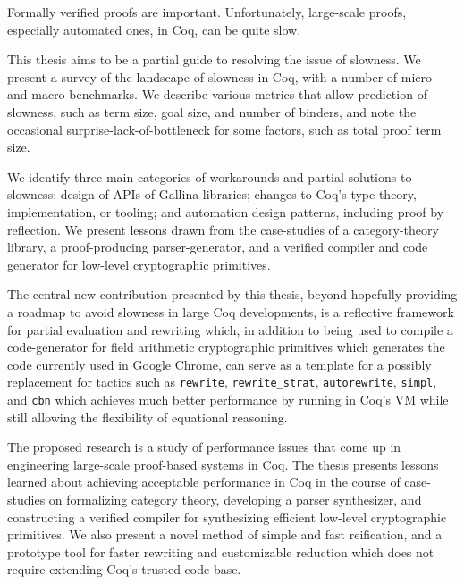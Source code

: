 %
%
%
Formally verified proofs are important.
Unfortunately, large-scale proofs, especially automated ones, in Coq, can be quite slow.

This thesis aims to be a partial guide to resolving the issue of slowness.
We present a survey of the landscape of slowness in Coq, with a number of micro- and macro-benchmarks.
We describe various metrics that allow prediction of slowness, such as term size, goal size, and number of binders, and note the occasional surprise-lack-of-bottleneck for some factors, such as total proof term size.

We identify three main categories of workarounds and partial solutions to slowness: design of APIs of Gallina libraries; changes to Coq's type theory, implementation, or tooling; and automation design patterns, including proof by reflection.
We present lessons drawn from the case-studies of a category-theory library, a proof-producing parser-generator, and a verified compiler and code generator for low-level cryptographic primitives.

The central new contribution presented by this thesis, beyond hopefully providing a roadmap to avoid slowness in large Coq developments, is a reflective framework for partial evaluation and rewriting which, in addition to being used to compile a code-generator for field arithmetic cryptographic primitives which generates the code currently used in Google Chrome, can serve as a template for a possibly replacement for tactics such as \texttt{rewrite}, \texttt{rewrite\_strat}, \texttt{autorewrite}, \texttt{simpl}, and \texttt{cbn} which achieves much better performance by running in Coq's VM while still allowing the flexibility of equational reasoning.


The proposed research is a study of performance issues that come up in engineering large-scale proof-based systems in Coq.
The thesis presents lessons learned about achieving acceptable performance in Coq in the course of case-studies on formalizing category theory, developing a parser synthesizer, and constructing a verified compiler for synthesizing efficient low-level cryptographic primitives.
We also present a novel method of simple and fast reification, and a prototype tool for faster rewriting and customizable reduction which does not require extending Coq's trusted code base.
